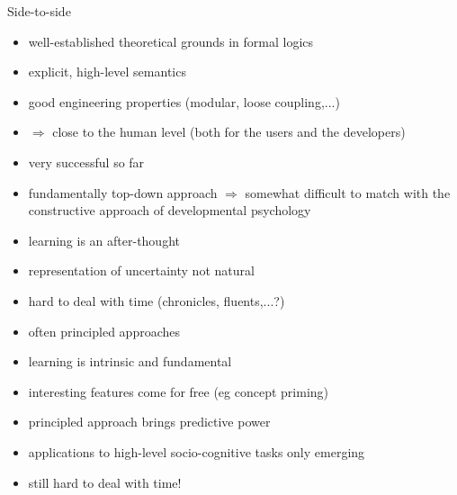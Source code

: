 \documentclass[compress]{beamer}
\begin{document}
\begin{frame}{Side-to-side}

    \scriptsize
    \begin{multicols}{2}


    \begin{itemize}
        \item {\Medium well-established theoretical grounds} in formal logics
        \item {\Medium explicit}, {\Medium high-level semantics}
        \item good engineering properties (modular, loose coupling,...)
        \item $\Rightarrow$ {\Medium close to the human level} (both for the users and the developers)
        \item {\Medium very successful} so far
        \item {\Medium fundamentally top-down} approach $\Rightarrow$ somewhat difficult to match with
            the constructive approach of developmental psychology
        \item {\Medium learning} is an {\Medium after-thought}
        \item representation of {\Medium uncertainty not natural}
        \item {\Medium hard to deal with time} (chronicles, fluents,...?)
    \end{itemize}

    \columnbreak


    \begin{itemize}
        \item often {\Medium principled approaches}
        \item {\Medium learning} is intrinsic and fundamental
        \item {\Medium interesting features} come for free (eg concept priming)
        \item principled approach brings {\Medium predictive power}
        \item applications to high-level socio-cognitive tasks only emerging
        \item {\Medium still hard to deal with time!}
    \end{itemize}

    \end{multicols}
\end{frame}
\end{document}
